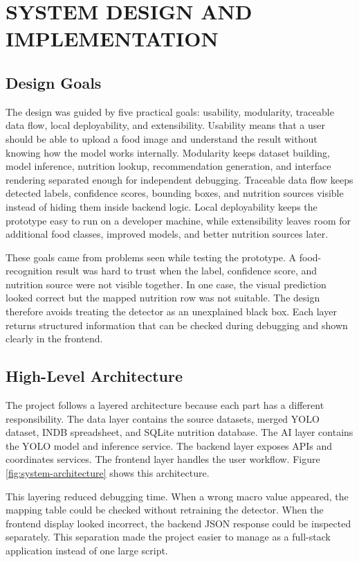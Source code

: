 \chapter{SYSTEM DESIGN AND IMPLEMENTATION}

\section{Design Goals}

The design was guided by five practical goals: usability, modularity, traceable data flow, local deployability, and extensibility. Usability means that a user should be able to upload a food image and understand the result without knowing how the model works internally. Modularity keeps dataset building, model inference, nutrition lookup, recommendation generation, and interface rendering separated enough for independent debugging. Traceable data flow keeps detected labels, confidence scores, bounding boxes, and nutrition sources visible instead of hiding them inside backend logic. Local deployability keeps the prototype easy to run on a developer machine, while extensibility leaves room for additional food classes, improved models, and better nutrition sources later.

These goals came from problems seen while testing the prototype. A food-recognition result was hard to trust when the label, confidence score, and nutrition source were not visible together. In one case, the visual prediction looked correct but the mapped nutrition row was not suitable. The design therefore avoids treating the detector as an unexplained black box. Each layer returns structured information that can be checked during debugging and shown clearly in the frontend.

\section{High-Level Architecture}

The project follows a layered architecture because each part has a different responsibility. The data layer contains the source datasets, merged YOLO dataset, INDB spreadsheet, and SQLite nutrition database. The AI layer contains the YOLO model and inference service. The backend layer exposes APIs and coordinates services. The frontend layer handles the user workflow. Figure \ref{fig:system-architecture} shows this architecture.

This layering reduced debugging time. When a wrong macro value appeared, the mapping table could be checked without retraining the detector. When the frontend display looked incorrect, the backend JSON response could be inspected separately. This separation made the project easier to manage as a full-stack application instead of one large script.

